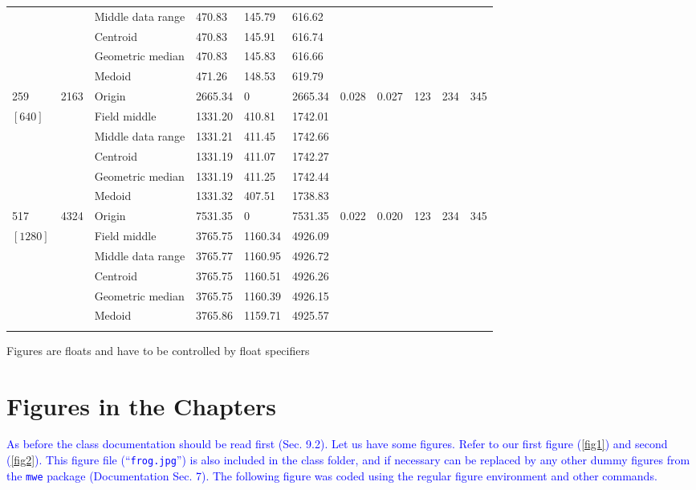\documentclass[phd]{ndsu-thesis-2022}
\newcommand\italk[1]{\textcolor{blue}{#1}}  %
\begin{document}
\begin{landscape}
{{\begin{ThreePartTable}
\begin{longtable}{lll lll ll rrr}
 &  & Middle data range  & 470.83 & 145.79 & 616.62 \\
 &  & Centroid & 470.83 & 145.91 & 616.74 \\
 &  & Geometric median & 470.83 & 145.83 & 616.66 \\
 &  & Medoid  & 471.26 & 148.53 & 619.79 \\
\midrule
259 & 2163 & Origin  & 2665.34 & 0 & 2665.34 & 0.028 & 0.027 & 123 & 234 & 345 \\
$[640]$ &  & Field middle  & 1331.20 & 410.81 & 1742.01 \\
 &  & Middle data range  & 1331.21 & 411.45 & 1742.66 \\
 &  & Centroid & 1331.19 & 411.07 & 1742.27 \\
 &  & Geometric median & 1331.19 & 411.25 & 1742.44 \\
 &  & Medoid  & 1331.32 & 407.51 & 1738.83 \\
\midrule
517 & 4324 & Origin  & 7531.35 & 0 & 7531.35 & 0.022 & 0.020 & 123 & 234 & 345 \\
$[1280]$ &  & Field middle  & 3765.75 & 1160.34 & 4926.09 \\
 &  & Middle data range  & 3765.77 & 1160.95 & 4926.72 \\
 &  & Centroid & 3765.75 & 1160.51 & 4926.26 \\
 &  & Geometric median & 3765.75 & 1160.39 & 4926.15 \\
 &  & Medoid  & 3765.86 & 1159.71 & 4925.57 \\
\label{longtabls} %
\end{longtable} 
\end{ThreePartTable}
}
}
\end{landscape}

\setlength{\parindent}{0.5in}
\vspace{-2ex}

{Figures are floats and have to be controlled by float specifiers}

\section{Figures in the Chapters}
\italk{As before the class documentation should be read first (Sec. 9.2). Let us have some figures. Refer to our first figure (\cref{fig1}) and second (\cref{fig2}). This figure file (``\texttt{frog.jpg}'') is also included in the class folder, and if necessary can be replaced by any other dummy figures from the \texttt{mwe} package (Documentation Sec. 7). The following figure was coded using the regular figure environment and other commands.}
\end{document}
